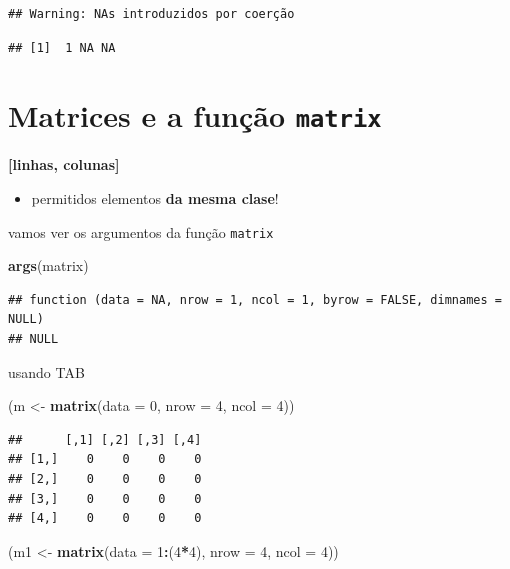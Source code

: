 \documentclass[]{book}
\newenvironment{Shaded}{\begin{snugshade}}{\end{snugshade}}
\newcommand{\KeywordTok}[1]{\textcolor[rgb]{0.13,0.29,0.53}{\textbf{#1}}}
\newcommand{\DataTypeTok}[1]{\textcolor[rgb]{0.13,0.29,0.53}{#1}}
\newcommand{\DecValTok}[1]{\textcolor[rgb]{0.00,0.00,0.81}{#1}}
\newcommand{\StringTok}[1]{\textcolor[rgb]{0.31,0.60,0.02}{#1}}
\newcommand{\OperatorTok}[1]{\textcolor[rgb]{0.81,0.36,0.00}{\textbf{#1}}}
\newcommand{\NormalTok}[1]{#1}
\providecommand{\tightlist}{%
  \setlength{\itemsep}{0pt}\setlength{\parskip}{0pt}}
\begin{document}
\begin{verbatim}
## Warning: NAs introduzidos por coerção
\end{verbatim}

\begin{verbatim}
## [1]  1 NA NA
\end{verbatim}

\section{\texorpdfstring{Matrices e a função
\texttt{matrix}}{Matrices e a função matrix}}\label{matrices-e-a-funcao-matrix}

\textbf{{[}linhas, colunas{]}}

\begin{itemize}
\tightlist
\item
  permitidos elementos \textbf{da mesma clase}!
\end{itemize}

vamos ver os argumentos da função \texttt{matrix}

\begin{Shaded}
\begin{Highlighting}[]
\KeywordTok{args}\NormalTok{(matrix)}
\end{Highlighting}
\end{Shaded}

\begin{verbatim}
## function (data = NA, nrow = 1, ncol = 1, byrow = FALSE, dimnames = NULL) 
## NULL
\end{verbatim}

usando TAB

\begin{Shaded}
\begin{Highlighting}[]
\NormalTok{(m <-}\StringTok{ }\KeywordTok{matrix}\NormalTok{(}\DataTypeTok{data =} \DecValTok{0}\NormalTok{, }\DataTypeTok{nrow =} \DecValTok{4}\NormalTok{, }\DataTypeTok{ncol =} \DecValTok{4}\NormalTok{))}
\end{Highlighting}
\end{Shaded}

\begin{verbatim}
##      [,1] [,2] [,3] [,4]
## [1,]    0    0    0    0
## [2,]    0    0    0    0
## [3,]    0    0    0    0
## [4,]    0    0    0    0
\end{verbatim}

\begin{Shaded}
\begin{Highlighting}[]
\NormalTok{(m1 <-}\StringTok{ }\KeywordTok{matrix}\NormalTok{(}\DataTypeTok{data =} \DecValTok{1}\OperatorTok{:}\NormalTok{(}\DecValTok{4}\OperatorTok{*}\DecValTok{4}\NormalTok{), }\DataTypeTok{nrow =} \DecValTok{4}\NormalTok{, }\DataTypeTok{ncol =} \DecValTok{4}\NormalTok{))}
\end{Highlighting}
\end{Shaded}
\end{document}
